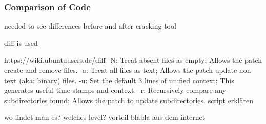 \subsubsection{Comparison of Code}\label{subsubsection:forensics-tools-diff}
needed to see differences before and after cracking tool\newline

diff is used\newline

https://wiki.ubuntuusers.de/diff\newline
-N: Treat absent files as empty; Allows the patch create and remove files.\newline
-a: Treat all files as text; Allows the patch update non-text (aka: binary) files.\newline
-u: Set the default 3 lines of unified context; This generates useful time stamps and context.\newline
-r: Recursively compare any subdirectories found; Allows the patch to update subdirectories.\newline
script erklären\newline



wo findet man es?\newline
welches level?\newline
vorteil\newline
blabla aus dem internet\newline
